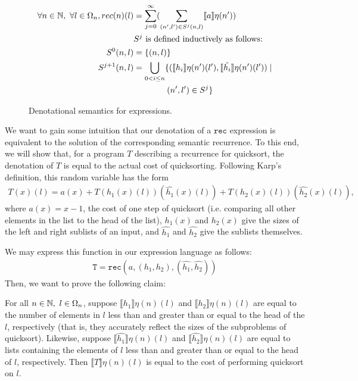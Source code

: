 \begin{figure}
\begin{align*}
  \forall n \in \N, \ 
    \forall l \in \Omega_n, 
    rec(n)(l) &= \sum_{j=0}^{\infty}(\sum_{(n',l') \in S^j(n,l)} \llbracket a \rrbracket\eta(n')) \\
    &S^j \text{ is defined inductively as follows:} \\
    S^0(n,l) &= \{(n, l)\} \\
    S^{j+1}(n,l) &= \bigcup_{0<i \leq n}\{(\llbracket h_i \rrbracket\eta(n')(l') , \llbracket \hat{h_i} \rrbracket\eta(n')(l')) \mid \\
     &\text{ \ \ \ \ \ \ \ \ \ \ \ }(n', l') \in S^j \}
 \end{align*}
 \caption{Denotational semantics for expressions.}
 \end{figure}

We want to gain some intuition that our denotation of a $\texttt{rec}$ expression is equivalent to the solution of
the corresponding semantic recurrence. To this end, we will show that, for a program $T$ describing a recurrence for 
quicksort, the denotation of $T$ is equal to the actual cost of quicksorting. 
 Following Karp's definition, this random variable has the form 
\begin{align*}
T(x)(l) = a(x) + T(h_1(x)(l))(\hat{h_1}(x)(l)) + T(h_2(x)(l))(\hat{h_2}(x)(l)), 
\end{align*}
where $a(x) = x-1$, the cost of one step of quicksort (i.e. comparing all other elements
in the list to the head of the list), $h_1(x)$ and $h_2(x)$ give the sizes of the left and right sublists of an input, and
$\hat{h_1}$ and $\hat{h_2}$ give the sublists themselves. 

We may express this function in our expression language
as follows:
\begin{align*}
\texttt{T} = \texttt{rec}(a, (h_1, h_2), (\hat{h_1}, \hat{h_2}))
\end{align*}
Then, we want to prove the following claim:
\begin{thm}
For all $n \in \mathbb{N}, \ l \in \Omega_n$, suppose $\llbracket h_1 \rrbracket\eta (n)(l)$ and $\llbracket h_2 \rrbracket\eta (n)(l)$
are equal to the number of elements in $l$ less than and greater than or equal to the head of the $l$, respectively (that is,
they accurately reflect the sizes of the subproblems of quicksort). Likewise, suppose
$\llbracket \hat{h_1} \rrbracket\eta (n)(l)$ and $\llbracket \hat{h_2} \rrbracket\eta (n)(l)$ are equal to lists containing the
elements of $l$ less than and greater than or equal to the head of $l$, respectively. 
 Then $\llbracket T \rrbracket\eta (n)(l)$ is equal to the cost
of performing quicksort on $l$. 
\end{thm} 

